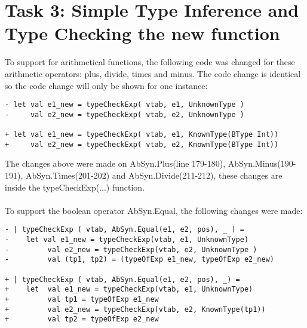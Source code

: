\section{Task 3: Simple Type Inference and Type Checking the new function}
To support for arithmetical functions, the following code was changed for these
arithmetic operators: plus, divide, times and minus. The code change is
identical so the code change will only be shown for one instance:
\begin{lstlisting}[style=MLStyle]
- let val e1_new = typeCheckExp( vtab, e1, UnknownType )
-     val e2_new = typeCheckExp( vtab, e2, UnknownType )

+ let val e1_new = typeCheckExp( vtab, e1, KnownType(BType Int))
+     val e2_new = typeCheckExp( vtab, e2, KnownType(BType Int))
\end{lstlisting}

The changes above were made on AbSyn.Plus(line 179-180), AbSyn.Minus(190-191),
AbSyn.Times(201-202) and AbSyn.Divide(211-212), these changes are inside the
typeCheckExp(...) function.\\
\\
To support the boolean operator AbSyn.Equal, the following changes were made:
\begin{lstlisting}[style=MLStyle]
- | typeCheckExp ( vtab, AbSyn.Equal(e1, e2, pos), _ ) =
-    let val e1_new = typeCheckExp(vtab, e1, UnknownType)
-         val e2_new = typeCheckExp(vtab, e2, UnknownType )
-         val (tp1, tp2) = (typeOfExp e1_new, typeOfExp e2_new)

+ | typeCheckExp ( vtab, AbSyn.Equal(e1, e2, pos), _) =
+    let  val e1_new = typeCheckExp(vtab, e1, UnknownType)
+         val tp1 = typeOfExp e1_new
+         val e2_new = typeCheckExp(vtab, e2, KnownType(tp1))
+         val tp2 = typeOfExp e2_new 
\end{lstlisting}

